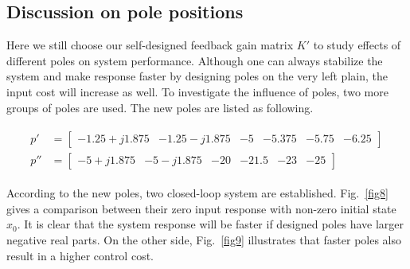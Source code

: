 \documentclass[hyperref]{article}
\theoremstyle{nonumberplain}
\begin{document}
	\subsection{Discussion on pole positions}
	
	\hspace{1.0em}
	Here we still choose our self-designed feedback gain matrix ${K}'$ to study effects of different poles on system performance. Although one can always stabilize the system and make response faster by designing poles on the very left plain, the input cost will increase as well. To investigate the influence of poles, two more groups of poles are used. The new poles are listed as following.
	
	\begin{equation}
	\begin{split}
	\begin{aligned}
	{p}'&= \begin{bmatrix}
	-1.25+j1.875 &-1.25-j1.875  &-5  &-5.375  &-5.75  &-6.25
	\end{bmatrix}\\
	{p}''&= \begin{bmatrix}
	-5+j1.875 &-5-j1.875 &-20  &-21.5  &-23  &-25 
	\end{bmatrix}
	\end{aligned}
	\end{split}
	\nonumber
	\end{equation}
	
	According to the new poles, two closed-loop system are established. Fig.~\ref{fig8} gives a comparison between their zero input response with non-zero initial state $x_{0}$. It is clear that the system response will be faster if designed poles have larger negative real parts. On the other side, Fig.~\ref{fig9} illustrates that faster poles also result in a higher control cost. 
	
\end{document}
